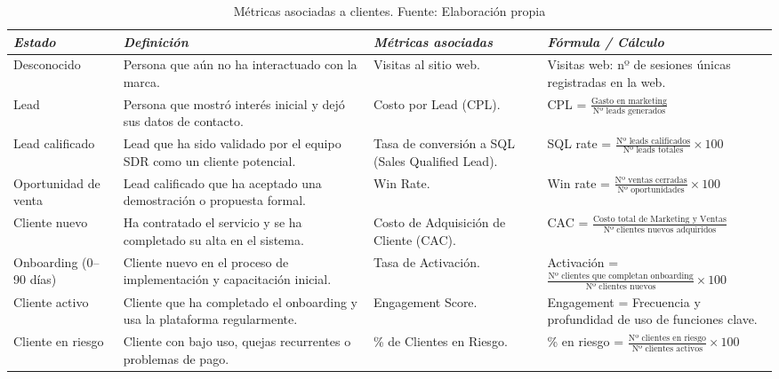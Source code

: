 \begin{appendixd}
\begin{table}[H]
  \begin{threeparttable}
    \centering
    \scriptsize
    \caption{Métricas asociadas a clientes. Fuente: Elaboración propia}
    \renewcommand{\arraystretch}{1.3}
    \begin{tabular}{|l|C{3.5cm}|C{3.3cm}|C{5.5cm}|}
      \hline
      \textit{Estado} & \textit{Definición} & \textit{Métricas asociadas} & \textit{Fórmula / Cálculo} \\
      \hline
      Desconocido & Persona que aún no ha interactuado con la marca. & Visitas al sitio web. &
      Visitas web: nº de sesiones únicas registradas en la web. \\
      \hline
      Lead & Persona que mostró interés inicial y dejó sus datos de contacto. &
      Costo por Lead (CPL). &
      CPL = $\tfrac{\text{Gasto en marketing}}{\text{Nº leads generados}}$ \\
      \hline
      Lead calificado & Lead que ha sido validado por el equipo SDR como un cliente potencial. &
      Tasa de conversión a SQL (Sales Qualified Lead). &
      SQL rate = $\tfrac{\text{Nº leads calificados}}{\text{Nº leads totales}} \times 100$ \\
      \hline
      Oportunidad de venta & Lead calificado que ha aceptado una demostración o propuesta formal. &
      Win Rate. &
      Win rate = $\tfrac{\text{Nº ventas cerradas}}{\text{Nº oportunidades}} \times 100$ \\
      \hline
      Cliente nuevo & Ha contratado el servicio y se ha completado su alta en el sistema. &
      Costo de Adquisición de Cliente (CAC). &
      CAC = $\tfrac{\text{Costo total de Marketing y Ventas}}{\text{Nº clientes nuevos adquiridos}}$ \\
      \hline
      Onboarding (0--90 días) & Cliente nuevo en el proceso de implementación y capacitación inicial. &
      Tasa de Activación. &
      Activación = $\tfrac{\text{Nº clientes que completan onboarding}}{\text{Nº clientes nuevos}} \times 100$ \\
      \hline
      Cliente activo & Cliente que ha completado el onboarding y usa la plataforma regularmente. &
      Engagement Score. &
      Engagement = Frecuencia y profundidad de uso de funciones clave. \\
      \hline
      Cliente en riesgo & Cliente con bajo uso, quejas recurrentes o problemas de pago. &
      \% de Clientes en Riesgo. &
      \% en riesgo = $\tfrac{\text{Nº clientes en riesgo}}{\text{Nº clientes activos}} \times 100$ \\

\end{tabular}
\end{threeparttable}
\end{table}
\end{appendixd}
